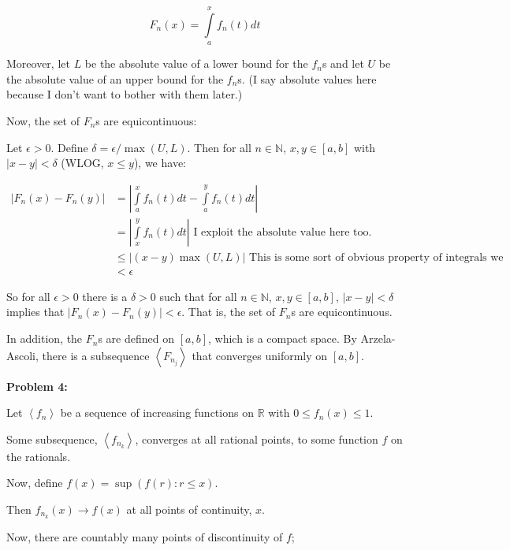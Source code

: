 \documentclass[a4paper,12pt]{article}
\newcommand{\tab}{\hspace{4mm}} %
\newcommand{\shunt}{\vspace{20mm}}
\newcommand{\absval}[1]{\left\lvert #1 \right\rvert}
\newcommand{\anbrack}[1]{\left\langle #1 \right\rangle}
\newcommand{\de}{\delta}
\newcommand{\ep}{\epsilon}
\newcommand{\N}{\mathbb{N}}
\newcommand{\R}{\mathbb{R}}
\begin{document}
\begin{displaymath}
F_n(x) = \int\limits_a^x f_n(t)dt
\end{displaymath}

Moreover, let $L$ be the absolute value of a lower bound for the $f_n$s and let $U$ be the absolute value of an upper bound for the $f_n$s. (I say absolute values here because I don't want to bother with them later.)

Now, the set of $F_n$s are equicontinuous:

\tab Let $\ep >0$. Define $\de = \ep /\max(U,L)$. Then for all $n \in \N$, $x, y \in [a,b]$ with $\absval{x-y} < \de$ (WLOG, $x \leq y$), we have:

\begin{align*}
\absval{F_n(x)-F_n(y)} &= \absval{\int\limits_a^x f_n(t)dt - \int\limits_a^y f_n(t)dt} \\
&= \absval{\int\limits_x^y f_n(t)dt} \text{ I exploit the absolute value here too.} \\
&\leq \absval{(x-y)\max(U,L)} \text{ This is some sort of obvious property of integrals we should know} \\
&< \ep
\end{align*}

\tab So for all $\ep>0$ there is a $\de >0$ such that for all $n \in \N$, $x,y \in [a,b]$, $\absval{x-y} < \de$ implies that $\absval{F_n(x)-F_n(y)} < \ep$. That is, the set of $F_n$s are equicontinuous.

In addition, the $F_n$s are defined on $[a,b]$, which is a compact space. By Arzela-Ascoli, there is a subsequence $\anbrack{F_{n_j}}$ that converges uniformly on $[a,b]$.

\shunt

{\bf Problem 4:}

Let $\anbrack{f_n}$ be a sequence of increasing functions on $\R$ with $0 \leq f_n(x) \leq 1$. 

Some subsequence, $\anbrack{f_{n_k}}$, converges at all rational points, to some function $f$ on the rationals.

\tab %

Now, define $f(x) = \sup(f(r): r \leq x)$.

Then $f_{n_k}(x) \to f(x)$ at all points of continuity, $x$.

\tab %

Now, there are countably many points of discontinuity of $f$;

\tab %
\end{document}
